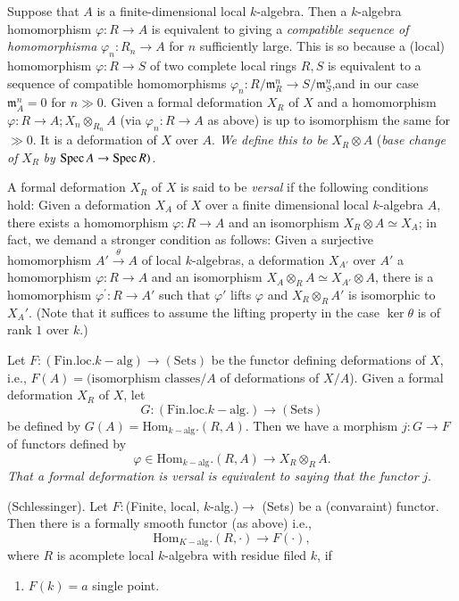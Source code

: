 {\begin{definition}
Suppose that $A$ is a finite-dimensional local $k$-algebra. Then a
$k$-algebra homomorphism $\varphi:R\to A$ is equivalent to giving a
{\em compatible sequence of homomorphisma} $\varphi_n:R_n\to A$ for
$n$ sufficiently large. This is so because a (local) homomorphism
$\varphi:R \to S$ of two complete local rings $R, S$ is equivalent to
a sequence of compatible homomorphisms
$\varphi_n:R/\mathfrak{m}_{R}^{n}\to
S/\mathfrak{m}_{S}^{n}$,\pageoriginale and in 
our case $\mathfrak{m}_{A}^{n}=0$ for $n \gg 0$. Given a formal
deformation $X_R$ of $X$ and a homomorphism $\varphi: R \to A;
X_n\otimes_{R_{n}} A$ (via $\varphi_n: R\to A$ as above) is up to
isomorphism the same for $\gg 0$. It is a deformation of $X$ over
$A$. {\em We define this to be} $X_R \otimes A$ ({\em base change of}
$X_R$ {\em by} $\operatorname{Spec} A \to \operatorname{Spec} R)$. 
\end{definition}

\begin{definition}\label{part1-defi7.2}%
A formal deformation $X_R$ of $X$ is said to be {\em versal} if the
following conditions hold: Given a deformation $X_A$ of $X$ over a
finite dimensional local $k$-algebra $A$, there exists a homomorphism
$\varphi: R\to A$ and an isomorphism $X_R\otimes A\simeq X_A$; in
fact, we demand a stronger condition as follows: Given a surjective
homomorphism $A'\xrightarrow{\theta} A$ of local $k$-algebras, a
deformation $X_{A'}$ over $A'$ a homomorphism $\varphi: R\to A$ and an
isomorphism $X_A\otimes_R A\simeq X_{A'} \otimes A$, there is a
homomorphism $\varphi^{'}:R\to A'$ such that $\varphi'$ lifts
$\varphi$ and $X_R\otimes_R A'$ is isomorphic to $X_A'$. (Note that it
suffices to assume the lifting property in the case $\ker \theta$ is
of rank $1$ over $k$.) 

Let $F:(\text{Fin}. \text{loc}. k-\text{alg})\to (\text{Sets})$ be the
functor defining deformations of $X$, i.e., $F(A)=(\text{isomorphism
classes}/A$ of deformations of $X/A$). Given a formal deformation
$X_R$ of $X$, let 
$$
G:(\text{Fin}. \text{loc}. k-\text{alg}.)\to (\text{Sets})
$$
be defined by $G(A)=\text{Hom}_{k-\text{alg}}. (R, A)$. Then we have a
morphism $j:G\to F$ of functors defined by 
$$
\varphi \in \text{Hom}_{k-\text{alg}}. (R, A)\to X_R \otimes_R A.
$$
{\em That a formal deformation is versal is equivalent to saying that
the functor} $j$. 
\end{definition}

\begin{theorem}\label{part1-thm7.1}%
(Schlessinger). Let $F:$(Finite, local, $k$-alg.)$\to$ (Sets) be a
(convaraint) functor. Then there is a formally smooth functor (as
above) i.e., 
$$
\text{Hom}_{K-\text{alg}}. (R, \cdot)\to F(\cdot),
$$
where $R$ is acomplete local $k$-algebra with residue filed $k$, if
\begin{enumerate}[\rm(1)]
\item $F(k)=a$ single point.


\end{enumerate}
\end{theorem}}
